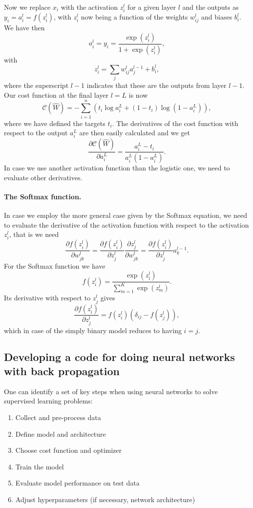 \documentclass[%
oneside,                 %
final,                   %
10pt]{article}
\begin{document}
Now we replace $x_i$ with the activation $z_i^l$ for a given layer $l$ and the outputs as $y_i=a_i^l=f(z_i^l)$, with $z_i^l$ now being a function of the weights $w_{ij}^l$ and biases $b_i^l$. 
We have then
\[
a_i^l = y_i = \frac{\exp{(z_i^l)}}{1+\exp{(z_i^l)}},
\]
with 
\[
z_i^l = \sum_{j}w_{ij}^l a_j^{l-1}+b_i^l,
\]
where the superscript $l-1$ indicates that these are the outputs from layer $l-1$.
Our cost function at the final layer $l=L$ is now
\[
\mathcal{C}(\hat{W}) = - \sum_{i=1}^n \left(t_i\log{a_i^L}+(1-t_i)\log{(1-a_i^L)}\right),
\]
where we have defined the targets $t_i$. The derivatives of the cost function with respect to the output $a_i^L$ are then easily calculated and we get
\[
\frac{\partial \mathcal{C}(\hat{W})}{\partial a_i^L} = \frac{a_i^L-t_i}{a_i^L(1-a_i^L)}. 
\]
In case we use another activation function than the logistic one, we need to evaluate other derivatives. 


\paragraph{The Softmax function.}
In case we employ the more general case given by the Softmax equation, we need to evaluate the derivative of the activation function with respect to the activation $z_i^l$, that is we need
\[
\frac{\partial f(z_i^l)}{\partial w_{jk}^l} =
\frac{\partial f(z_i^l)}{\partial z_j^l} \frac{\partial z_j^l}{\partial w_{jk}^l}= \frac{\partial f(z_i^l)}{\partial z_j^l}a_k^{l-1}.
\]
For the Softmax function we have
\[
f(z_i^l) = \frac{\exp{(z_i^l)}}{\sum_{m=1}^K\exp{(z_m^l)}}.
\]
Its derivative with respect to $z_j^l$ gives 
\[
\frac{\partial f(z_i^l)}{\partial z_j^l}= f(z_i^l)\left(\delta_{ij}-f(z_j^l)\right), 
\]
which in case of the simply binary model reduces to  having $i=j$. 

\subsection{Developing a code for doing neural networks with back propagation}


One can identify a set of key steps when using neural networks to solve supervised learning problems:  

\begin{enumerate}
\item Collect and pre-process data  

\item Define model and architecture  

\item Choose cost function and optimizer  

\item Train the model  

\item Evaluate model performance on test data  

\item Adjust hyperparameters (if necessary, network architecture)
\end{enumerate}
\end{document}
